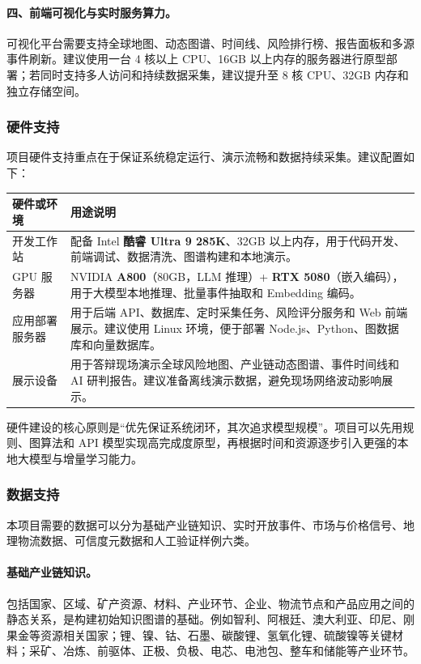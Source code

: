 ﻿\documentclass[12pt,a4paper]{article}
\begin{document}
\paragraph{四、前端可视化与实时服务算力。}可视化平台需要支持全球地图、动态图谱、时间线、风险排行榜、报告面板和多源事件刷新。建议使用一台 4 核以上 CPU、16GB 以上内存的服务器进行原型部署；若同时支持多人访问和持续数据采集，建议提升至 8 核 CPU、32GB 内存和独立存储空间。

\subsubsection{硬件支持}

项目硬件支持重点在于保证系统稳定运行、演示流畅和数据持续采集。建议配置如下：

\begin{longtable}{p{}p{}}
\toprule
\textbf{硬件或环境} & \textbf{用途说明} \\
\midrule
开发工作站 & 配备 Intel \textbf{酷睿 Ultra 9 285K}、32GB 以上内存，用于代码开发、前端调试、数据清洗、图谱构建和本地演示。 \\
\midrule
GPU 服务器 & NVIDIA \textbf{A800}（80GB，LLM 推理）+ \textbf{RTX 5080}（嵌入编码），用于大模型本地推理、批量事件抽取和 Embedding 编码。 \\
\midrule
应用部署服务器 & 用于后端 API、数据库、定时采集任务、风险评分服务和 Web 前端展示。建议使用 Linux 环境，便于部署 Node.js、Python、图数据库和向量数据库。 \\
\midrule
展示设备 & 用于答辩现场演示全球风险地图、产业链动态图谱、事件时间线和 AI 研判报告。建议准备离线演示数据，避免现场网络波动影响展示。 \\
\bottomrule
\end{longtable}

硬件建设的核心原则是“优先保证系统闭环，其次追求模型规模”。项目可以先用规则、图算法和 API 模型实现高完成度原型，再根据时间和资源逐步引入更强的本地大模型与增量学习能力。

\subsubsection{数据支持}

本项目需要的数据可以分为基础产业链知识、实时开放事件、市场与价格信号、地理物流数据、可信度元数据和人工验证样例六类。

\paragraph{基础产业链知识。}包括国家、区域、矿产资源、材料、产业环节、企业、物流节点和产品应用之间的静态关系，是构建初始知识图谱的基础。例如智利、阿根廷、澳大利亚、印尼、刚果金等资源相关国家；锂、镍、钴、石墨、碳酸锂、氢氧化锂、硫酸镍等关键材料；采矿、冶炼、前驱体、正极、负极、电芯、电池包、整车和储能等产业环节。
\end{document}
